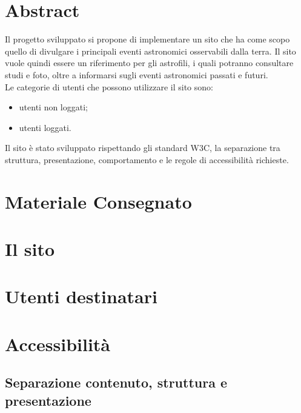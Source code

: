 	
	\section{Abstract}
	Il progetto sviluppato si propone di implementare un sito che ha come scopo quello di divulgare i principali eventi astronomici osservabili dalla terra.
	Il sito vuole quindi essere un riferimento per gli astrofili, i quali potranno consultare studi e foto, oltre a informarsi sugli eventi astronomici passati e futuri. \\
	Le categorie di utenti che possono utilizzare il sito sono:
	\begin{itemize}
	\item utenti non loggati;
	\item utenti loggati.
	\end{itemize}
	Il sito è stato sviluppato rispettando gli
	standard W3C, la separazione tra struttura, presentazione, comportamento
	e le regole di accessibilità richieste.
	
	\section{Materiale Consegnato}
	\section{Il sito}
	\section{Utenti destinatari}
	\section{Accessibilità}
	\subsection{Separazione contenuto, struttura e presentazione}

